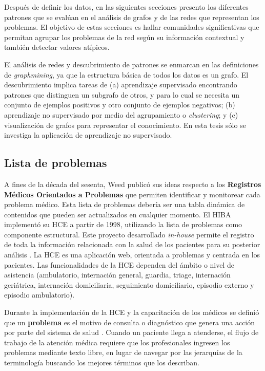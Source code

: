 Después de definir los datos, en las siguientes secciones presento los diferentes patrones que se evalúan en el análisis de grafos y de las redes que representan los problemas. El objetivo de estas secciones es hallar comunidades significativas que permitan agrupar los problemas de la red según su información contextual y también detectar valores atípicos. 

El análisis de redes y descubrimiento de patrones se enmarcan en las definiciones de \textit{graphmining}, ya que la estructura básica de todos los datos es un grafo. El descubrimiento implica tareas de (a) aprendizaje supervisado encontrando patrones que distinguen un subgrafo de otros, y para lo cual se necesita un conjunto de ejemplos positivos y otro conjunto de ejemplos negativos; (b) aprendizaje no supervisado por medio del agrupamiento o \textit{clustering}; y (c) visualización de grafos para representar el conocimiento. En esta tesis sólo se investiga la aplicación de aprendizaje no supervisado. 


\subsection{Lista de problemas}
A fines de la década del sesenta, Weed \cite{Weed1968} publicó sus ideas respecto a los \textbf{Registros Médicos Orientados a Problemas} que permiten identificar y monitorear cada problema médico. Esta lista de problemas debería ser una tabla dinámica de contenidos que pueden ser actualizados en cualquier momento. El \acrshort{HIBA} implementó su \acrshort{HCE} a partir de 1998, utilizando la lista de problemas como componente estructural. Este proyecto desarrollado \textit{in-house} permite el registro de toda la información relacionada con la salud de los pacientes para su posterior análisis \cite{Luna2013,luna2003implementacion}. La \acrshort{HCE} es una aplicación web, orientada a problemas y centrada en los pacientes. Las funcionalidades de la \acrshort{HCE} dependen del ámbito o nivel de asistencia (ambulatorio, internación general, guardia, triage, internación geriátrica, internación domiciliaria, seguimiento domiciliario, episodio externo y episodio ambulatorio).
 
Durante la implementación de la \acrshort{HCE} y la capacitación de los médicos se definió que un \textbf{problema} es el motivo de consulta o diagnóstico que genera una acción por parte del sistema de salud \cite{lopez2004codificacion}. Cuando un paciente llega a atenderse, el flujo de trabajo de la atención médica requiere que los profesionales ingresen los problemas mediante texto libre, en lugar de navegar por las jerarquías de la terminología buscando los mejores términos que los describan.

